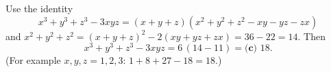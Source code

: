 Use the identity
\[
x^3+y^3+z^3-3xyz=(x+y+z)\left(x^2+y^2+z^2-xy-yz-zx\right)
\]
and $x^2+y^2+z^2=(x+y+z)^2-2(xy+yz+zx)=36-22=14$. Then
\[
x^3+y^3+z^3-3xyz=6\,(14-11)=\boxed{\textbf{(c) }18} .
\]
(For example $x,y,z=1,2,3$: $1+8+27-18=18$.)
